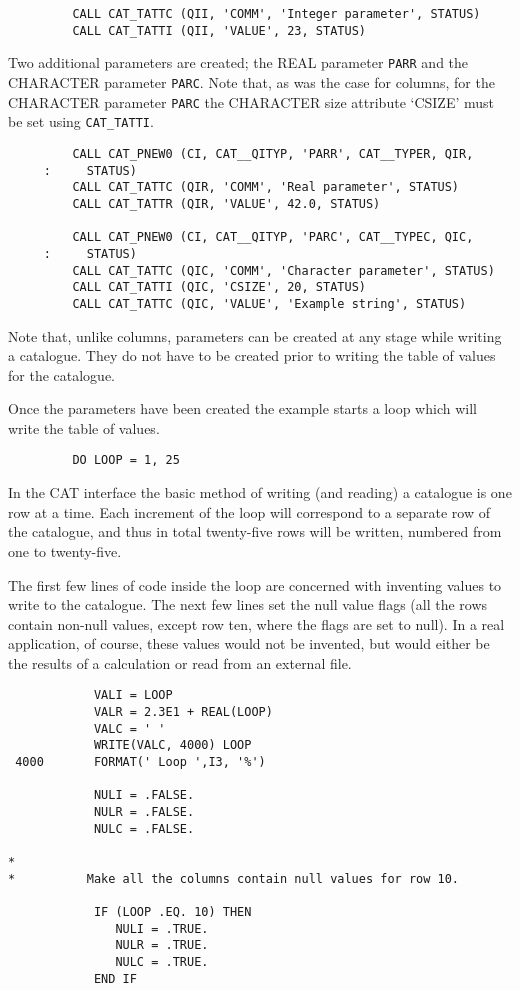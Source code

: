 \begin{verbatim}
         CALL CAT_TATTC (QII, 'COMM', 'Integer parameter', STATUS)
         CALL CAT_TATTI (QII, 'VALUE', 23, STATUS)
\end{verbatim}

Two additional parameters are created; the REAL parameter {\tt PARR} and
the CHARACTER parameter {\tt PARC}. Note that, as was the case for
columns, for the CHARACTER parameter {\tt PARC} the CHARACTER size
attribute `CSIZE' must be set using {\tt CAT\_TATTI}.

\begin{verbatim}
         CALL CAT_PNEW0 (CI, CAT__QITYP, 'PARR', CAT__TYPER, QIR,
     :     STATUS)
         CALL CAT_TATTC (QIR, 'COMM', 'Real parameter', STATUS)
         CALL CAT_TATTR (QIR, 'VALUE', 42.0, STATUS)

         CALL CAT_PNEW0 (CI, CAT__QITYP, 'PARC', CAT__TYPEC, QIC,
     :     STATUS)
         CALL CAT_TATTC (QIC, 'COMM', 'Character parameter', STATUS)
         CALL CAT_TATTI (QIC, 'CSIZE', 20, STATUS)
         CALL CAT_TATTC (QIC, 'VALUE', 'Example string', STATUS)
\end{verbatim}

Note that, unlike columns, parameters can be created at any stage
while writing a catalogue. They do not have to be created prior to
writing the table of values for the catalogue.

Once the parameters have been created the example starts a loop which
will write the table of values.

\begin{verbatim}
         DO LOOP = 1, 25
\end{verbatim}

In the CAT interface the basic method of writing (and reading) a
catalogue is one row at a time. Each increment of the loop will
correspond to a separate row of the catalogue, and thus in total
twenty-five rows will be written, numbered from one to twenty-five.

The first few lines of code inside the loop are concerned with inventing
values to write to the catalogue. The next few lines  set the null value
flags (all the rows contain non-null values, except row ten, where the
flags are set to null). In a real application, of course, these values
would not be invented, but would either be the results of a calculation
or read from an external file.

\begin{verbatim}
            VALI = LOOP
            VALR = 2.3E1 + REAL(LOOP)
            VALC = ' '
            WRITE(VALC, 4000) LOOP
 4000       FORMAT(' Loop ',I3, '%')

            NULI = .FALSE.
            NULR = .FALSE.
            NULC = .FALSE.

*
*          Make all the columns contain null values for row 10.

            IF (LOOP .EQ. 10) THEN
               NULI = .TRUE.
               NULR = .TRUE.
               NULC = .TRUE.
            END IF
\end{verbatim}

